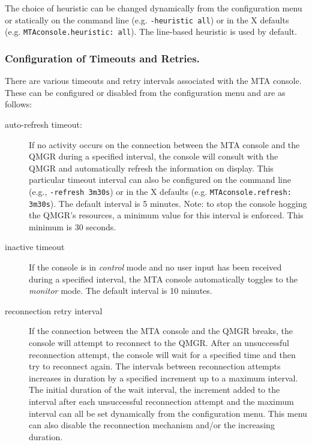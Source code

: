 The choice of heuristic can be changed dynamically from the
configuration menu or statically on the command line (e.g.
\verb+-heuristic all+) or in the X defaults (e.g.
\verb+MTAconsole.heuristic: all+).
The line-based heuristic is used by default.

\subsubsection	{Configuration of Timeouts and Retries.}

There are various timeouts and retry intervals associated with the MTA
console.
These can be configured or disabled from the configuration menu and
are as follows:
\begin{description}

\item[auto-refresh timeout:] If no activity occurs on the connection
between the MTA console and the QMGR during a specified interval, the
console will consult with the QMGR and automatically refresh the
information on display.
This particular timeout interval can also be configured on the command line
(e.g., \verb+-refresh 3m30s+) or in the X defaults (e.g.
\verb+MTAconsole.refresh: 3m30s+).
The default interval is 5 minutes.  Note: to stop the console hogging
the QMGR's resources, a minimum value for this interval is enforced.
This minimum is 30 seconds.

\item[inactive timeout] If the console is in {\em control} mode and no
user input has been received during a specified interval, the MTA
console automatically toggles to the {\em monitor} mode.
The default interval is 10 minutes.

\item[reconnection retry interval] If the connection between the
MTA console and the QMGR breaks, the console will attempt to reconnect
to the QMGR.
After an unsuccessful reconnection attempt, the console will wait for
a specified time and then try to reconnect again.
The intervals between reconnection attempts increases in duration by a
specified increment up to a maximum interval.
The initial duration of the wait interval, the increment added to
the interval after each unsuccessful reconnection attempt and the
maximum interval can all be set dynamically  from the configuration menu.
This menu can also disable the reconnection mechanism and/or the
increasing duration.

\end{description}

